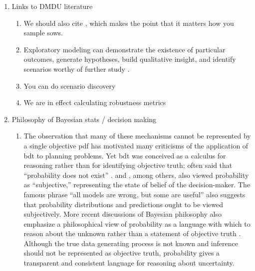 \documentclass[12pt]{article}
\begin{document}
\begin{enumerate}
    \item Links to DMDU literature
          \begin{enumerate}
              \item We should also cite \citet{quinn_exploratory:2020}, which makes the point that it matters how you sample \glspl{sow}.
              \item Exploratory modeling can demonstrate the existence of particular outcomes, generate hypotheses, build qualitative insight, and identify scenarios worthy of further study \citep[see][]{bankes:1993}.
              \item You can do scenario discovery
              \item We are in effect calculating robustness metrics \citep{mcphail_robustness:2019,herman:2015}
          \end{enumerate}
    \item Philosophy of Bayesian stats / decision making
          \begin{enumerate}
              \item The observation that many of these mechanisms cannot be represented by a single objective \gls{pdf} has motivated many criticisms of the application of \gls{bdt} to planning problems.
                    Yet \gls{bdt} was conceived as a calculus for reasoning rather than for identifying objective truth; \citeauthor{definetti_probability:1972} often said that ``probability does not exist'' \citeyear{definetti_probability:1972}.
                    \citet{savage:1954} and \citet{ramsey_probability:2016}, among others, also viewed probability as ``subjective,'' representing the state of belief of the decision-maker.
                    The famous phrase ``all models are wrong, but some are useful'' \citep[generally attributed to][]{box:1976} also suggests that probability distributions and predictions ought to be viewed subjectively.
                    More recent discussions of Bayesian philosophy \citep{jaynes_probability:2003,McElreath:2016vu,Gelman:2014tc,bernardo_bayesian:1994} also emphasize a philosophical view of probability as a language with which to reason about the unknown rather than a statement of objective truth \citep[see][for a thorough discussion of Bayesian philosophy]{gelman_philosophy:2013}.
                    Although the true data generating process is not known and inference should not be represented as objective truth, probability gives a transparent and consistent language for reasoning about uncertainty.

\end{enumerate}
\end{enumerate}
\end{document}
